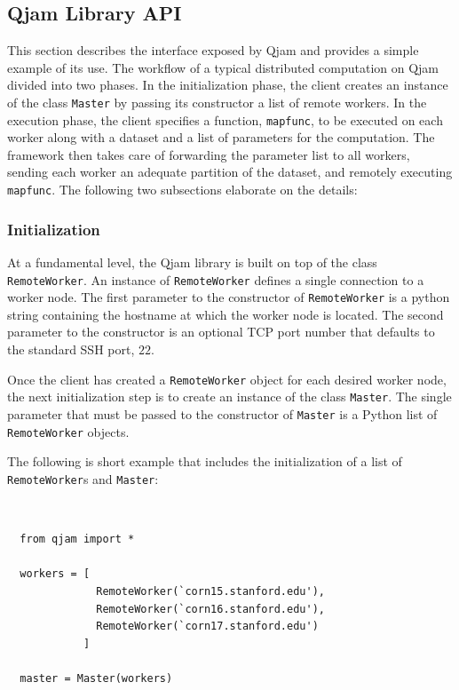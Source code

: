 \documentclass[%
  final,
  notitlepage,
  narroweqnarray,
  inline,
]{ieee}
\begin{document}
\subsection{Qjam Library API}
\label{Library}

This section describes the interface exposed by Qjam and provides a simple
example of its use. The workflow of a typical distributed computation on Qjam
divided into two phases. In the initialization phase, the client creates an
instance of the class \texttt{Master} by passing its constructor a list of
remote workers. In the execution phase, the client specifies a function,
\texttt{mapfunc}, to be executed on each worker along with a dataset and a list
of parameters for the computation. The framework then takes care of forwarding
the parameter list to all workers, sending each worker an adequate partition of
the dataset, and remotely executing \texttt{mapfunc}. The following two
subsections elaborate on the details:

\subsubsection{Initialization}

At a fundamental level, the Qjam library is built on top of the class
\texttt{RemoteWorker}. An instance of \texttt{RemoteWorker} defines
a single connection to a worker node. The first parameter to the constructor of
\texttt{RemoteWorker} is a python string containing the hostname at which the
worker node is located. The second parameter to the constructor is an optional
TCP port number that defaults to the standard SSH port, $22$.

Once the client has created a \texttt{RemoteWorker} object for each desired
worker node, the next initialization step is to create an instance of the class
\texttt{Master}. The single parameter that must be passed
to the constructor of \texttt{Master} is a Python list of \texttt{RemoteWorker}
objects.

The following is short example that includes the initialization of a list
of \texttt{RemoteWorker}s and \texttt{Master}:

{\tt \small
\begin{verbatim}
  from qjam import *
  
  workers = [
              RemoteWorker(`corn15.stanford.edu'),
              RemoteWorker(`corn16.stanford.edu'),
              RemoteWorker(`corn17.stanford.edu')
            ]

  master = Master(workers)
\end{verbatim}}
\end{document}
